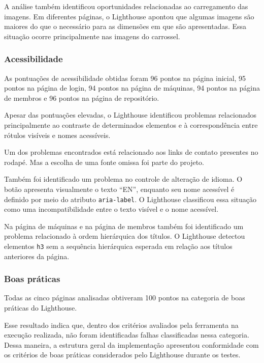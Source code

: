 A análise também identificou oportunidades relacionadas ao carregamento das imagens. Em diferentes páginas, o Lighthouse apontou que algumas imagens são maiores do que o necessário para as dimensões em que são apresentadas. Essa situação ocorre principalmente nas imagens do carrossel.

\subsubsection{Acessibilidade}

As pontuações de acessibilidade obtidas foram 96 pontos na página inicial, 95 pontos na página de login, 94 pontos na página de máquinas, 94 pontos na página de membros e 96 pontos na página de repositório.

Apesar das pontuações elevadas, o Lighthouse identificou problemas relacionados principalmente ao contraste de determinados elementos e à correspondência entre rótulos visíveis e nomes acessíveis.

Um dos problemas encontrados está relacionado aos links de contato presentes no rodapé. Mas a escolha de uma fonte omissa foi parte do projeto. 

Também foi identificado um problema no controle de alteração de idioma. O botão apresenta visualmente o texto ``EN'', enquanto seu nome acessível é definido por meio do atributo \texttt{aria-label}. O Lighthouse classificou essa situação como uma incompatibilidade entre o texto visível e o nome acessível.

Na página de máquinas e na página de membros também foi identificado um problema relacionado à ordem hierárquica dos títulos. O Lighthouse detectou elementos \texttt{h3} sem a sequência hierárquica esperada em relação aos títulos anteriores da página.


\subsubsection{Boas práticas}

Todas as cinco páginas analisadas obtiveram 100 pontos na categoria de boas práticas do Lighthouse.

Esse resultado indica que, dentro dos critérios avaliados pela ferramenta na execução realizada, não foram identificadas falhas classificadas nessa categoria. Dessa maneira, a estrutura geral da implementação apresentou conformidade com os critérios de boas práticas considerados pelo Lighthouse durante os testes.

